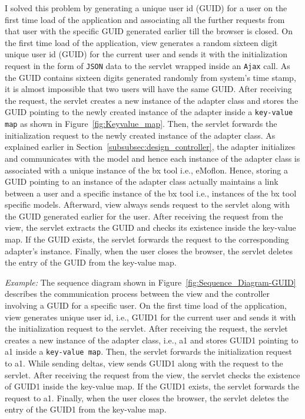 I solved this problem by generating a unique user id (GUID) for a user on the first time load of the application and associating all the further requests from that user with the specific GUID generated earlier till the browser is closed. On the first time load of the application, view generates a random sixteen digit unique user id (GUID) for the current user and sends it with the initialization request in the form of \texttt{JSON} data to the servlet wrapped inside an \texttt{Ajax} call. As the GUID contains sixteen digits generated randomly from system's time stamp, it is almost impossible that two users will have the same GUID. After receiving the request, the servlet creates a new instance of the adapter class and stores the GUID pointing to the newly created instance of the adapter inside a \texttt{key-value map} as shown in Figure~\ref{fig:Keyvalue_map}. Then, the servlet forwards the initialization request to the newly created instance of the adapter class. As explained earlier in Section~\ref{subsubsec:design_controller}, the adapter initializes and communicates with the model and hence each instance of the adapter class is associated with a unique instance of the bx tool i.e., eMoflon. Hence, storing a GUID pointing to an instance of the adapter class actually maintains a link between a user and a specific instance of the bx tool i.e., instances of the bx tool specific models. Afterward, view always sends request to the servlet along with the GUID generated earlier for the user. After receiving the request from the view, the servlet extracts the GUID and checks its existence inside the  key-value map. If the GUID exists, the servlet forwards the request to the corresponding adapter's instance. Finally, when the user closes the browser, the servlet deletes the entry of the GUID from the key-value map.

\textit{Example:} The sequence diagram shown in Figure~\ref{fig:Sequence_Diagram-GUID} describes the communication process between the view and the controller involving a GUID for a specific user. On the first time load of the application, view generates unique user id, i.e., GUID1 for the current user and sends it with the initialization request to the servlet. After receiving the request, the servlet creates a new instance of the adapter class, i.e., a1 and stores GUID1 pointing to a1 inside a \texttt{key-value map}. Then, the servlet forwards the initialization request to a1. While sending deltas, view sends GUID1 along with the request to the servlet. After receiving the request from the view, the servlet checks the existence of GUID1 inside the key-value map. If the GUID1 exists, the servlet forwards the request to a1. Finally, when the user closes the browser, the servlet deletes the entry of the GUID1 from the key-value map.

